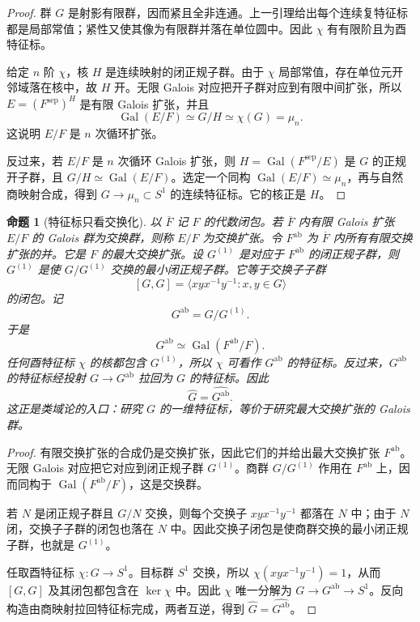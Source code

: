 \documentclass[11pt,a4paper,openany]{ctexbook}
\numberwithin{equation}{chapter}
\newcommand{\Gal}{\operatorname{Gal}}
\theoremstyle{plain}
\newtheorem{proposition}[theorem]{命题}
\theoremstyle{definition}
\theoremstyle{remark}
\begin{document}
\begin{proof}
群 $G$ 是射影有限群，因而紧且全非连通。上一引理给出每个连续复特征标都是局部常值；紧性又使其像为有限群并落在单位圆中。因此 $\chi$ 有有限阶且为酉特征标。

给定 $n$ 阶 $\chi$，核 $H$ 是连续映射的闭正规子群。由于 $\chi$ 局部常值，存在单位元开邻域落在核中，故 $H$ 开。无限 Galois 对应把开子群对应到有限中间扩张，所以 $E=(F^{\mathrm{sep}})^H$ 是有限 Galois 扩张，并且
\[
\Gal(E/F)\simeq G/H\simeq\chi(G)=\mu_n.
\]
这说明 $E/F$ 是 $n$ 次循环扩张。

反过来，若 $E/F$ 是 $n$ 次循环 Galois 扩张，则 $H=\Gal(F^{\mathrm{sep}}/E)$ 是 $G$ 的正规开子群，且 $G/H\simeq\Gal(E/F)$。选定一个同构 $\Gal(E/F)\simeq\mu_n$，再与自然商映射合成，得到 $G\to\mu_n\subset S^1$ 的连续特征标。它的核正是 $H$。
\end{proof}

\begin{proposition}[特征标只看交换化]
以 $\overline F$ 记 $F$ 的代数闭包。若 $\overline F$ 内有限 Galois 扩张 $E/F$ 的 Galois 群为交换群，则称 $E/F$ 为交换扩张。令 $F^{\mathrm{ab}}$ 为 $\overline F$ 内所有有限交换扩张的并。它是 $F$ 的最大交换扩张。设 $G^{(1)}$ 是对应于 $F^{\mathrm{ab}}$ 的闭正规子群，则 $G^{(1)}$ 是使 $G/G^{(1)}$ 交换的最小闭正规子群。它等于交换子子群
\[
[G,G]=\langle xyx^{-1}y^{-1}:x,y\in G\rangle
\]
的闭包。记
\[
G^{\mathrm{ab}}=G/G^{(1)}.
\]
于是
\[
G^{\mathrm{ab}}\simeq \Gal(F^{\mathrm{ab}}/F).
\]
任何酉特征标 $\chi$ 的核都包含 $G^{(1)}$，所以 $\chi$ 可看作 $G^{\mathrm{ab}}$ 的特征标。反过来，$G^{\mathrm{ab}}$ 的特征标经投射 $G\to G^{\mathrm{ab}}$ 拉回为 $G$ 的特征标。因此
\[
\widehat G=\widehat{G^{\mathrm{ab}}}.
\]
这正是类域论的入口：研究 $G$ 的一维特征标，等价于研究最大交换扩张的 Galois 群。
\end{proposition}

\begin{proof}
有限交换扩张的合成仍是交换扩张，因此它们的并给出最大交换扩张 $F^{\mathrm{ab}}$。无限 Galois 对应把它对应到闭正规子群 $G^{(1)}$。商群 $G/G^{(1)}$ 作用在 $F^{\mathrm{ab}}$ 上，因而同构于 $\Gal(F^{\mathrm{ab}}/F)$，这是交换群。

若 $N$ 是闭正规子群且 $G/N$ 交换，则每个交换子 $xyx^{-1}y^{-1}$ 都落在 $N$ 中；由于 $N$ 闭，交换子子群的闭包也落在 $N$ 中。因此交换子闭包是使商群交换的最小闭正规子群，也就是 $G^{(1)}$。

任取酉特征标 $\chi:G\to S^1$。目标群 $S^1$ 交换，所以 $\chi(xyx^{-1}y^{-1})=1$，从而 $[G,G]$ 及其闭包都包含在 $\ker\chi$ 中。因此 $\chi$ 唯一分解为 $G\to G^{\mathrm{ab}}\to S^1$。反向构造由商映射拉回特征标完成，两者互逆，得到 $\widehat G=\widehat{G^{\mathrm{ab}}}$。
\end{proof}
\end{document}
